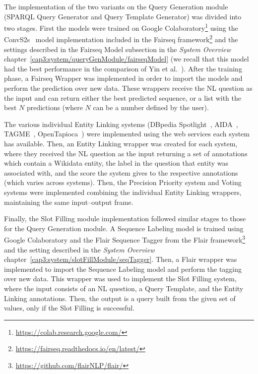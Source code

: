 The implementation of the two variants on the Query Generation module (SPARQL Query Generator 
and Query Template Generator) was divided into two stages. First the models were trained on 
Google Colaboratory\footnote{\url{https://colab.research.google.com/}} using the 
ConvS2s~\cite{nmt:convS2S-GehringAGYD17} model implementation included in the Fairseq 
framework\footnote{\url{https://fairseq.readthedocs.io/en/latest/}} and the settings described in the 
Fairseq Model subsection in the \textit{System Overview} chapter~\ref{cap3:system/queryGenModule/fairseqModel} 
(we recall that this model had 
the best performance in the comparison of Yin et al.~\cite{nmt:nl-to-sparql-Yin19}). After the 
training phase, a Fairseq Wrapper was implemented in order to import the models and perform the 
prediction over new data. These wrappers receive the NL question as the input and can return 
either the best predicted sequence, or a list with the best $N$ predictions (where $N$ can be a 
number defined by the user).

The various individual Entity Linking systems (DBpedia Spotlight~\cite{EL:dbpedia-spotlight-MendesJGB11}, 
AIDA~\cite{EL:aida-tool-YosefHBSW11, EL:aida-HoffartYBFPSTTW11}, TAGME~\cite{EL:tagme-FerraginaS10}, 
OpenTapioca~\cite{EL:opentapioca-Delpeuch19}) were implemented using the web services each system 
has available. Then, an Entity Linking wrapper was created for each system, where they received the 
NL question as the input returning a set of annotations which contain a Wikidata entity, the 
label in the question that entity was associated with, and the score the system gives to the 
respective annotations (which varies across systems). Then, the Precision Priority system and 
Voting systems were implemented combining the individual Entity Linking wrappers, maintaining 
the same input--output frame.

Finally, the Slot Filling module implementation followed similar stages to those for the Query 
Generation module. A Sequence Labeling model is trained using Google Colaboratory and the Flair 
Sequence Tagger from the Flair framework\footnote{\url{https://github.com/flairNLP/flair/}} and 
the setting described in the \textit{System Overview} chapter~\ref{cap3:system/slotFillModule/seqTagger}. 
Then, a Flair wrapper was implemented to import the Sequence Labeling model and perform the 
tagging over new data. This wrapper was used to implement the Slot Filling system, where the 
input consists of an NL question, a Query Template, and the Entity Linking annotations. Then, 
the output is a \SPARQL{} query built from the given set of values, only if the Slot Filling is 
successful.

